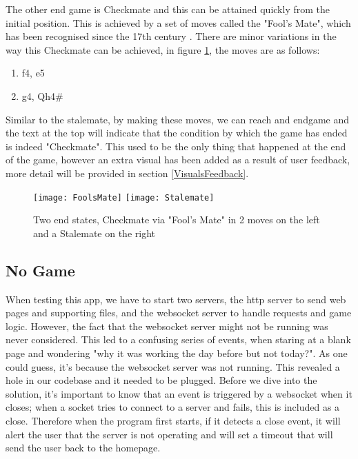 The other end game is Checkmate and this can be attained quickly from the initial position. This is achieved by a set of moves called the "Fool's Mate", which has been recognised since the 17th century \cite{FoolsMateBook}. There are minor variations in the way this Checkmate can be achieved, in figure \ref{EndGameExamples}, the moves are as follows:
\begin{enumerate}
    \item f4, e5
    \item g4, Qh4\#
\end{enumerate}
Similar to the stalemate, by making these moves, we can reach and endgame and the text at the top will indicate that the condition by which the game has ended is indeed "Checkmate". This used to be the only thing that happened at the end of the game, however an extra visual has been added as a result of user feedback, more detail will be provided in section \ref{VisualsFeedback}.

\begin{figure}[h]
    \begin{center}
        \texttt{[image: FoolsMate]}
        \texttt{[image: Stalemate]}
        \caption{Two end states, Checkmate via "Fool's Mate" in 2 moves on the left and a Stalemate on the right}
        \label{EndGameExamples}
    \end{center}
\end{figure}

\subsection{No Game}

When testing this app, we have to start two servers, the http server to send web pages and supporting files, and the websocket server to handle requests and game logic. However, the fact that the websocket server might not be running was never considered. This led to a confusing series of events, when staring at a blank page and wondering "why it was working the day before but not today?". As one could guess, it's because the websocket server was not running. This revealed a hole in our codebase and it needed to be plugged. Before we dive into the solution, it's important to know that an event is triggered by a websocket when it closes; when a socket tries to connect to a server and fails, this is included as a close. Therefore when the program first starts, if it detects a close event, it will alert the user that the server is not operating and will set a timeout that will send the user back to the homepage.

